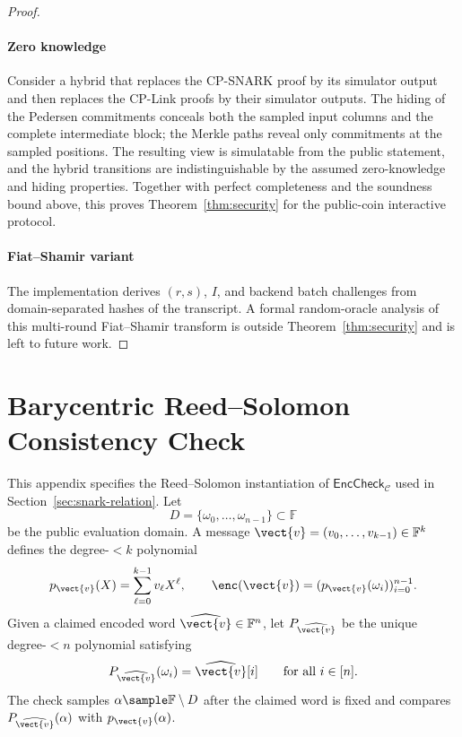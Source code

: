 \begin{proof}
\paragraph{Zero knowledge}
Consider a hybrid that replaces the CP-SNARK proof by its simulator output and
then replaces the CP-Link proofs by their simulator outputs.  The hiding of the
Pedersen commitments conceals both the sampled input columns and the complete
intermediate block; the Merkle paths reveal only commitments at the sampled
positions.  The resulting view is simulatable from the public statement, and
the hybrid transitions are indistinguishable by the assumed zero-knowledge and
hiding properties.  Together with perfect completeness and the soundness bound
above, this proves Theorem~\ref{thm:security} for the public-coin interactive
protocol.

\paragraph{Fiat--Shamir variant}
The implementation derives \((r,s)\), \(I\), and backend batch challenges from
domain-separated hashes of the transcript. A formal random-oracle analysis of
this multi-round Fiat--Shamir transform is outside Theorem~\ref{thm:security}
and is left to future work.
\end{proof}

\section{Barycentric Reed--Solomon Consistency Check}
\label{app:rs-barycentric}

This appendix specifies the Reed--Solomon instantiation of
\(\mathsf{EncCheck}_{\mathcal{C}}\) used in
Section~\ref{sec:snark-relation}.  Let
\[
D=\{\omega_0,\ldots,\omega_{n-1}\}\subset\mathbb{F}
\]
be the public evaluation domain.  A message
\(\vect{v}=(v_0,\ldots,v_{k-1})\in\mathbb{F}^k\) defines the degree-\(<k\)
polynomial
\[
  p_{\vect{v}}(X)=\sum_{\ell=0}^{k-1} v_\ell X^\ell,
  \qquad
  \enc(\vect{v})=(p_{\vect{v}}(\omega_i))_{i=0}^{n-1}.
\]
Given a claimed encoded word
\(\widehat{\vect{v}}\in\mathbb{F}^n\), let
\(P_{\widehat{\vect{v}}}\) be the unique degree-\(<n\) polynomial satisfying
\[
  P_{\widehat{\vect{v}}}(\omega_i)=\widehat{\vect{v}}[i]
  \qquad\text{for all }i\in[n].
\]
The check samples \(\alpha\sample\mathbb{F}\setminus D\) after the claimed
word is fixed and compares \(P_{\widehat{\vect{v}}}(\alpha)\) with
\(p_{\vect{v}}(\alpha)\).

